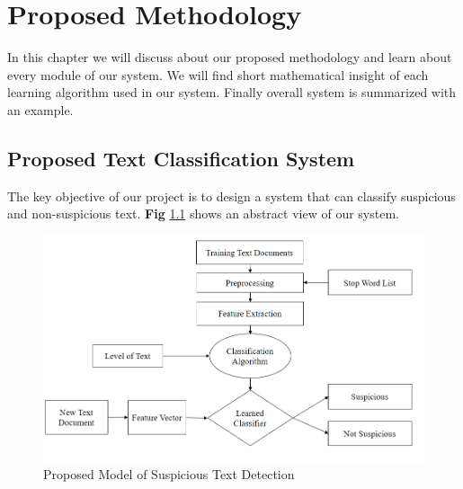 \documentclass[12pt,a4paper]{report}
\begin{document}






\tableofcontents
\listoffigures
\listoftables
\clearpage
{}

\onehalfspacing  %



    
\chapter{Proposed Methodology}
\thispagestyle{empty}
In this chapter we will discuss about our proposed methodology and learn about every module of our system. We will find short mathematical insight of each learning algorithm used in our system. Finally overall system is summarized with an example.
\section{Proposed Text Classification System}
The key objective of our project is to design a system that can classify suspicious and non-suspicious text. \textbf{Fig} \ref{fig:proposed_model} shows an abstract view of our system.
\vspace{0.5cm}
\begin{figure}[h!]
\centering
  \includegraphics[scale=0.6]{Figures/proposed_model.PNG}
  \caption{Proposed Model of Suspicious Text Detection}
  \label{fig:proposed_model}
\end{figure}
 
\end{document}
